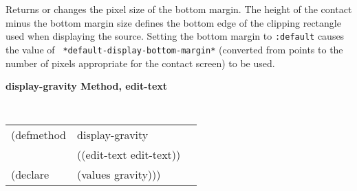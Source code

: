 \begin{flushright} \parbox[t]{6.125in}{
Returns or changes the pixel size of the
bottom margin.  The height of the contact minus the bottom margin size defines
the bottom edge of the clipping rectangle used when displaying the source.
Setting the bottom margin to {\tt :default} causes the value of {\tt
*default-display-bottom-margin*} (converted from points to the number of pixels
appropriate for the contact screen) to be used.
}
\end{flushright}




%
%
%
%
%
%


{\samepage  
{\large {\bf display-gravity \hfill Method, edit-text}}
\begin{flushright} \parbox[t]{6.125in}{
\tt
\begin{tabular}{lll}
\raggedright
(defmethod & display-gravity & \\
& ((edit-text  edit-text)) \\
(declare & (values gravity)))
\end{tabular}
\rm

}\end{flushright}}

